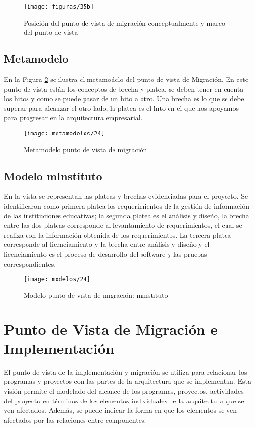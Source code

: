   \begin{figure}[H]
	\centering
	\texttt{[image: figuras/35b]}
	\captionsetup{width=.95\textwidth}
	\caption{Posición del punto de vista de migración conceptualmente y marco del punto de vista \cite{ref9}}
	\label{figura36}
  \end{figure}

  \subsection{Metamodelo}
  En la Figura \ref{metamodelo24} se ilustra el metamodelo del punto de vista de Migración, En este punto de vista están los conceptos de brecha y platea, se deben tener en cuenta los hitos y como se puede pasar de un hito a otro. Una brecha es lo que se debe superar para alcanzar el otro lado, la platea es el hito en el que nos apoyamos para progresar en la arquitectura empresarial. \cite{ref9}

  \begin{figure}[H]
	\centering
	\texttt{[image: metamodelos/24]}
	\captionsetup{width=.95\textwidth}
	\caption{Metamodelo punto de vista de migración \cite{ref9}}
	\label{metamodelo24}
  \end{figure}

  \subsection{Modelo mInstituto}
  En la vista se representan las plateas y brechas evidenciadas para el proyecto.  Se identificaron como primera platea los requerimientos de la gestión de información de las instituciones educativas; la segunda platea es el análisis y diseño, la brecha entre las dos plateas corresponde al levantamiento de requerimientos, el cual se realiza con la información obtenida de los requerimientos.  La tercera platea corresponde al licenciamiento y la brecha entre análisis y diseño y el licenciamiento es el proceso de desarrollo del software y las pruebas correspondientes. 
  
  \begin{figure}[H]
	\centering
	\texttt{[image: modelos/24]}
	\captionsetup{width=.95\textwidth}
	\caption{Modelo punto de vista de migración: minstituto}
	\label{modelo24}
  \end{figure}
  
\section{Punto de Vista de Migración e Implementación}
El punto de vista de la implementación y migración se utiliza para relacionar los programas y proyectos con las partes de la arquitectura que se implementan. Esta visión permite el modelado del alcance de los programas, proyectos, actividades del proyecto en términos de los elementos individuales de la arquitectura que se ven afectados. Además, se puede indicar la forma en que los elementos se ven afectados por las relaciones entre componentes. \cite{ref9}

